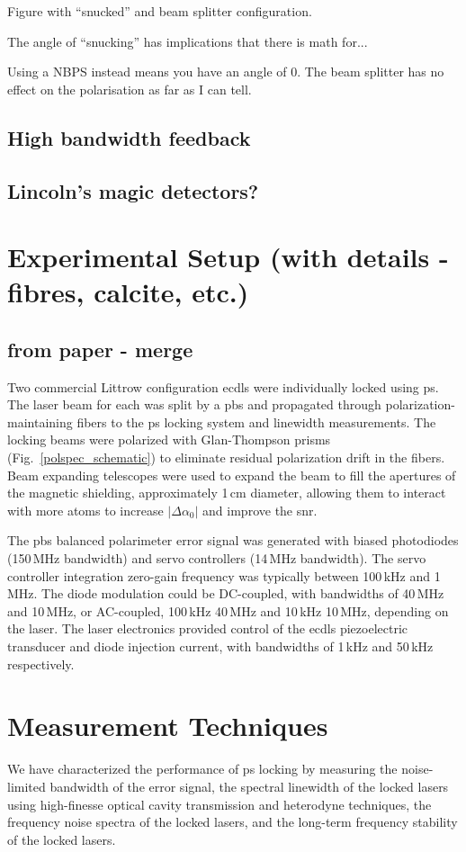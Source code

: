 Figure with ``snucked'' and beam splitter configuration.

The angle of ``snucking'' has implications that there is math for...

Using a NBPS instead means you have an angle of 0. The beam splitter has no effect on the polarisation as far as I can tell.

\subsection{High bandwidth feedback}
\subsection{Lincoln's magic detectors?}
\section{Experimental Setup (with details - fibres, calcite, etc.)}
\subsection{from paper - merge}
Two commercial Littrow configuration \glspl*{ecdl} \cite{equipment} were individually locked using \gls*{ps}. The laser beam for each was split by a \gls*{pbs} and propagated through polarization-maintaining fibers to the \gls*{ps} locking system and linewidth measurements.  The locking beams were polarized with Glan-Thompson prisms (Fig.~\ref{polspec_schematic}) to eliminate residual polarization drift in the fibers. Beam expanding telescopes were used to expand the beam to fill the apertures of the magnetic shielding, approximately 1\,cm diameter, allowing them to interact with more atoms to increase $|\Delta\alpha_0|$ and improve the \gls*{snr}.

The \gls*{pbs} balanced polarimeter error signal was generated with biased photodiodes (150\,MHz bandwidth) and servo controllers (14\,MHz bandwidth).  The servo controller integration zero-gain frequency was typically between 100\,kHz and 1\,MHz. The diode modulation could be DC-coupled, with bandwidths of 40\,MHz and 10\,MHz, or AC-coupled, 100\,kHz\,\textendash\,40\,MHz and 10\,kHz\,\textendash\,10\,MHz, depending on the laser.  The laser electronics provided control of the \glspl*{ecdl} piezoelectric transducer and diode injection current, with bandwidths of 1\,kHz and 50\,kHz respectively.
\section{Measurement Techniques}
We have characterized the performance of \gls*{ps} locking by measuring the noise-limited bandwidth of the error signal, the spectral linewidth of the locked lasers using high-finesse optical cavity transmission and heterodyne techniques, the frequency noise spectra of the locked lasers, and the long-term frequency stability of the locked lasers.

